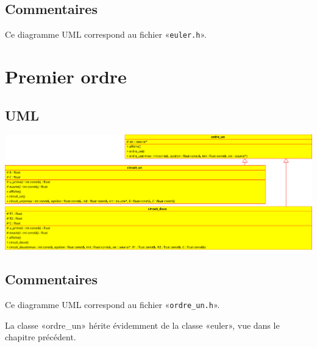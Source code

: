 \documentclass{report}
\begin{document}
    \section{Commentaires}
        Ce diagramme UML correspond au fichier «\verb|euler.h|».

\chapter{Premier ordre}
    \begin{multicols}{2}
        \section{UML}
            \includegraphics[width=\linewidth+\linewidth,angle=90]{images/ordre_un}

        \section{Commentaires}
            Ce diagramme UML correspond au fichier «\verb|ordre_un.h|».

            La classe «ordre\_un» hérite évidemment de la classe «euler», vue dans le chapitre précédent.
    \end{multicols}
\end{document}
